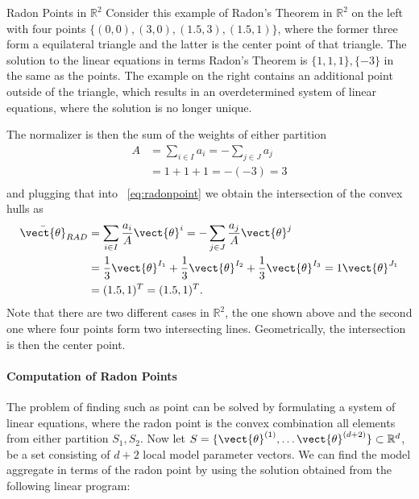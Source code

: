 \begin{example}{Radon Points in $\mathbb{R}^2$}
    \label{ex:radon}
    Consider this example of Radon's Theorem in $\mathbb{R}^2$ on the left with four points $\{(0,0), (3,0), (1.5, 3), (1.5,1)\}$, where the former three form a equilateral triangle and the latter is the center point of that triangle.
    The solution to the linear equations in terms Radon's Theorem is $\{1,1,1\},\{-3\}$ in the same as  the points. 
    The example on the right contains an additional point outside of the triangle, which results in an overdetermined system of linear equations, where the solution is no longer unique.
    
     
    The normalizer is then the sum of the weights of either partition
    \begin{equation}
        \begin{split}
            A &= \sum_{i\in I} a_i = - \sum_{j \in J} a_j \\
            &= 1 + 1 + 1 = -(-3) = 3 \\
        \end{split}
    \end{equation}
    and plugging that into \eq~\ref{eq:radonpoint} we obtain the intersection of the convex hulls as
    \begin{equation}
        \begin{split}
            \bar{\vect{\theta}}_{RAD} &= \sum_{i\in I} \frac{a_i}{A} \vect{\theta}^i = - \sum_{j \in J} \frac{a_j}{A} \vect{\theta}^j \\
            &= \frac{1}{3} \vect{\theta}^{I_1} + \frac{1}{3} \vect{\theta}^{I_2} + \frac{1}{3} \vect{\theta}^{I_3} = 1 \vect{\theta}^{J_1} \\
            & =  (1.5, 1)^T = (1.5, 1)^T.
        \end{split}
    \end{equation}
    Note that there are two different cases in $\mathbb{R}^2$, the one shown above and the second one where four points form two intersecting lines. Geometrically, the intersection is then the center point.

\end{example}
   

\paragraph*{Computation of Radon Points}

The problem of finding such as point can be solved by formulating a system of linear equations, where the radon point is the convex combination all elements from either partition $S_1, S_2$.
Now let $S = \{\vect{\theta}^{(1)}, \ldots \vect{\theta}^{(d+2)}\} \subset \mathbb{R}^d$, be a set consisting of $d+2$ local model parameter vectors.
We can find the model aggregate in terms of the radon point by using the solution obtained from the following linear program:

